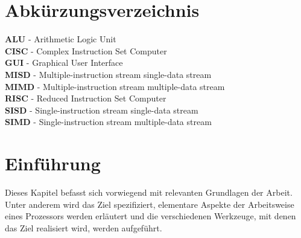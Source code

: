 \documentclass[12pt]{article}
\begin{document}
\newpage

\thispagestyle{empty}
\tableofcontents

\newpage

\thispagestyle{plain}
\cleardoublepage
{}
\listoffigures

\listoftables

\newpage

\thispagestyle{plain}
\cleardoublepage
\section*{Abkürzungsverzeichnis}
\textbf{ALU} - Arithmetic Logic Unit\\
\textbf{CISC} - Complex Instruction Set Computer\\
\textbf{GUI} - Graphical User Interface\\
\textbf{MISD} - Multiple-instruction stream single-data stream\\
\textbf{MIMD} - Multiple-instruction stream multiple-data stream\\
\textbf{RISC} - Reduced Instruction Set Computer\\
\textbf{SISD} - Single-instruction stream single-data stream\\
\textbf{SIMD} - Single-instruction stream multiple-data stream

\newpage
{}

\pagestyle{scrheadings} %

\clearpairofpagestyles
\clearmainofpairofpagestyles

\ihead[]{\leftmark} %

\cfoot[\pagemark]{\pagemark} %



\section{Einführung}
Dieses Kapitel befasst sich vorwiegend mit relevanten Grundlagen der Arbeit. Unter anderem wird das Ziel spezifiziert, elementare Aspekte der Arbeitsweise eines Prozessors werden erläutert und die verschiedenen Werkzeuge, mit denen das Ziel realisiert wird, werden aufgeführt.
\end{document}
